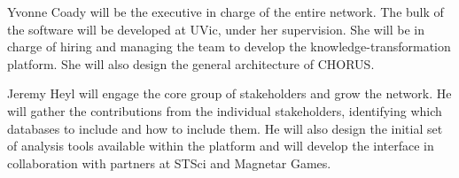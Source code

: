 Yvonne Coady will be the executive in charge of the entire network.
The bulk of the software will be developed at UVic, under her
supervision. She will be in charge of hiring and managing the team to
develop the knowledge-transformation platform. She will also design
the general architecture of CHORUS.

Jeremy Heyl will engage the core group of stakeholders and grow the
network.  He will gather the contributions from the individual
stakeholders, identifying which databases to include and how to
include them.  He will also design the initial set of analysis tools
available within the platform and will develop the interface in
collaboration with partners at STSci and Magnetar Games.
 
